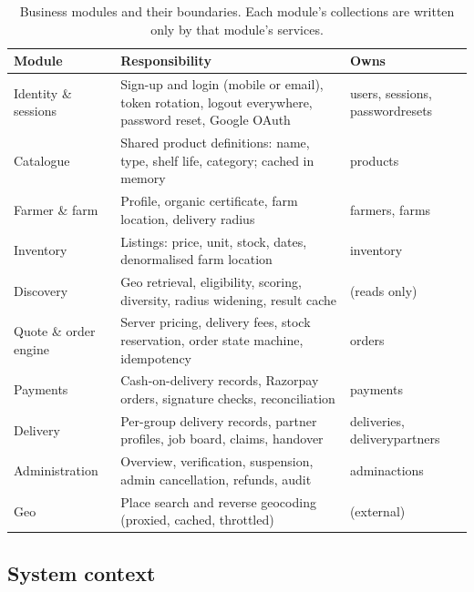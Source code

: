 \documentclass[manuscript,screen,review]{acmart}
\begin{document}
\begin{table}[htbp]
  \caption{Business modules and their boundaries. Each module's collections are written only by that module's services.}
  \label{tab:modules}
  \small
  \begin{tabularx}{\columnwidth}{@{}p{}Lp{0.25\columnwidth}@{}}
    \toprule
    \textbf{Module} & \textbf{Responsibility} & \textbf{Owns} \\
    \midrule
    Identity \& sessions & Sign-up and login (mobile or email), token rotation, logout everywhere, password reset, Google OAuth & users, sessions, passwordresets \\
    Catalogue & Shared product definitions: name, type, shelf life, category; cached in memory & products \\
    Farmer \& farm & Profile, organic certificate, farm location, delivery radius & farmers, farms \\
    Inventory & Listings: price, unit, stock, dates, denormalised farm location & inventory \\
    Discovery & Geo retrieval, eligibility, scoring, diversity, radius widening, result cache & (reads only) \\
    Quote \& order engine & Server pricing, delivery fees, stock reservation, order state machine, idempotency & orders \\
    Payments & Cash-on-delivery records, Razorpay orders, signature checks, reconciliation & payments \\
    Delivery & Per-group delivery records, partner profiles, job board, claims, handover & deliveries, deliverypartners \\
    Administration & Overview, verification, suspension, admin cancellation, refunds, audit & adminactions \\
    Geo & Place search and reverse geocoding (proxied, cached, throttled) & (external) \\
    \bottomrule
  \end{tabularx}
\end{table}

\subsection{System context}
\end{document}
